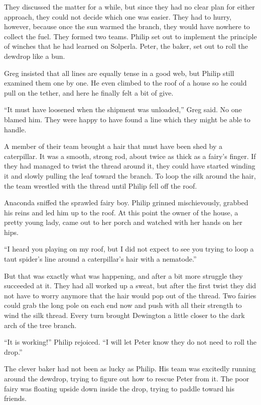 \documentclass[10pt, draft]{memoir}
\begin{document}
They discussed the matter for a while, but since they had no clear plan for
either approach, they could not decide which one was easier. They had to hurry,
however, because once the sun warmed the branch, they would have nowhere to
collect the fuel. They formed two teams. Philip set out to implement the
principle of winches that he had learned on Solperla. Peter, the baker, set out
to roll the dewdrop like a bun.

Greg insisted that all lines are equally tense in a good web, but Philip still
examined them one by one. He even climbed to the roof of a house so he could
pull on the tether, and here he finally felt a bit of give.

``It must have loosened when the shipment was unloaded,'' Greg said. No one
blamed him. They were happy to have found a line which they might be able to
handle.

A member of their team brought a hair that must have been shed by a
caterpillar. It was a smooth, strong rod, about twice as thick as a fairy's
finger. If they had managed to twist the thread around it, they could have
started winding it and slowly pulling the leaf toward the branch. To loop the
silk around the hair, the team wrestled with the thread until Philip fell off
the roof.

Anaconda sniffed the sprawled fairy boy. Philip grinned mischievously, grabbed
his reins and led him up to the roof. At this point the owner of the house, a
pretty young lady, came out to her porch and watched with her hands on her
hips.

``I heard you playing on my roof, but I did not expect to see you trying to
loop a taut spider's line around a caterpillar's hair with a nematode.''

But that was exactly what was happening, and after a bit more struggle they
succeeded at it. They had all worked up a sweat, but after the first twist they
did not have to worry anymore that the hair would pop out of the thread. Two
fairies could grab the long pole on each end now and push with all their
strength to wind the silk thread. Every turn brought Dewington a little closer
to the dark arch of the tree branch.

``It is working!'' Philip rejoiced. ``I will let Peter know they do not need to
roll the drop.''

The clever baker had not been as lucky as Philip. His team was excitedly
running around the dewdrop, trying to figure out how to rescue Peter from it.
The poor fairy was floating upside down inside the drop, trying to paddle
toward his friends.
\end{document}

